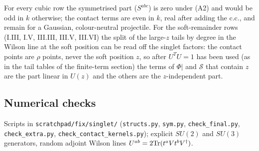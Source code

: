 For every cubic row the symmetrised part ($S^{abc}$) is zero under (A2) and would be odd in $k$ otherwise; the contact terms are even in $k$, real after adding the c.c., and remain for a Gaussian, colour-neutral projectile. For the soft-remainder rows (I.III, I.V, III.III, III.V, III.VI) the split of the large-$z$ tails by degree in the Wilson line at the soft position can be read off the singlet factors: the contact points are $\rho$ points, never the soft position $z$, so after $U^{T}U=1$ has been used (as in the tail tables of the finite-term section) the terms of $\Phi|$ and $\mathcal{S}$ that contain $z$ are the part linear in $U(z)$ and the others are the $z$-independent part.

\subsection{Numerical checks}\label{sec:s-checks}
\noindent Scripts in \texttt{scratchpad/fix/singlet/} (\texttt{structs.py}, \texttt{sym.py}, \texttt{check\_final.py}, \texttt{check\_extra.py}, \texttt{check\_contact\_kernels.py}); explicit $SU(2)$ and $SU(3)$ generators, random adjoint Wilson lines $U^{ab}=2{\rm Tr}(t^{a}Vt^{b}V^{\dagger})$.
